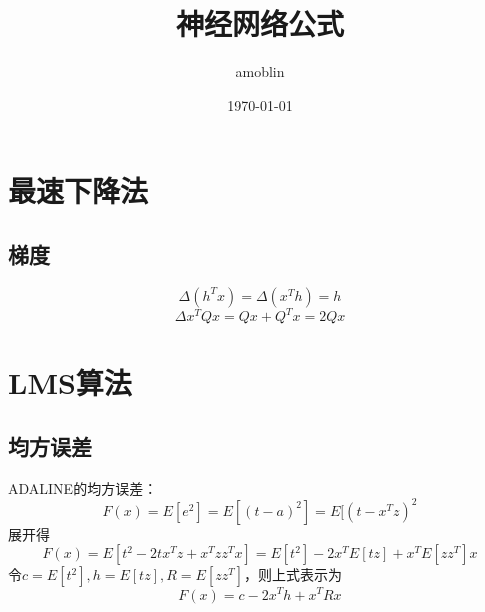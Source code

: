 \documentclass[a4paper,12pt]{article}
\title{神经网络公式}
\author{amoblin}
\date{\today}
\begin{document}
\begin{CJK*}{UTF8}{gbsn}
\maketitle
\section{最速下降法}
\subsection{梯度}
\begin{equation}
\Delta(h^Tx) = \Delta(x^Th) = h
\end{equation}
\begin{equation}
\Delta x^TQx = Qx + Q^Tx = 2Qx
\end{equation}
\section{LMS算法}
\subsection{均方误差}
ADALINE的均方误差：
\begin{equation}
F(x)= E[e^2] = E[(t-a)^2] = E[(t-x^Tz)^2
\end{equation}
展开得
\begin{equation}
F(x) = E[t^2 - 2tx^Tz + x^Tzz^Tx]
= E[t^2] - 2x^TE[tz] + x^TE[zz^T]x
\end{equation}
令$ c = E[t^2], h = E[tz], R = E[zz^T] $，则上式表示为
\begin{equation}
F(x) = c - 2x^Th + x^TRx
\end{equation}
\end{CJK*}
\end{document}
